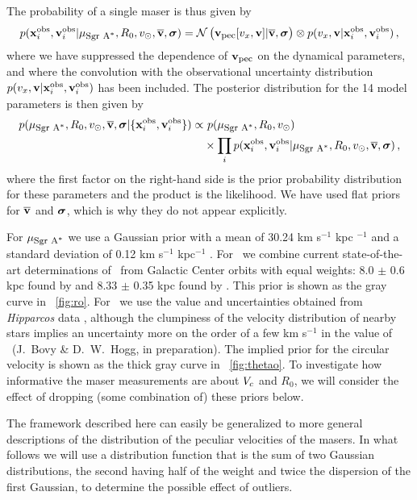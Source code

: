 The probability of a single maser is thus given by
\begin{equation}\label{eq:onelike}
p(\boldsymbol{\mathbf{x}}_i^{\mathrm{obs}},\boldsymbol{\mathbf{v}}_i^{\mathrm{obs}}|\mu_{\mbox{{\footnotesize Sgr A$^*$}}},R_0,v_\odot,\overline{\boldsymbol{\mathbf{v}}},\mbox{\boldmath$\sigma$}) =
\mathcal{N}\left(\boldsymbol{\mathbf{v}}_{\mbox{{\footnotesize pec}}}[v_x,\boldsymbol{\mathbf{v}}]|\overline{\boldsymbol{\mathbf{v}}},\mbox{\boldmath$\sigma$}\right)\otimes p(v_x,\boldsymbol{\mathbf{v}}|\boldsymbol{\mathbf{x}}_i^{\mathrm{obs}},\boldsymbol{\mathbf{v}}_i^{\mathrm{obs}})\,,
\end{equation}
where we have suppressed the dependence of $\boldsymbol{\mathbf{v}}_{\mbox{{\footnotesize pec}}}$ on the dynamical
parameters, and where the convolution with the observational
uncertainty distribution
$p(v_x,\boldsymbol{\mathbf{v}}|\boldsymbol{\mathbf{x}}_i^{\mathrm{obs}},\boldsymbol{\mathbf{v}}_i^{\mathrm{obs}})$ has been
included. The posterior distribution for the 14 model parameters is
then given by
\begin{equation}\label{eq:posterior}
\begin{split}
p(\mu_{\mbox{{\footnotesize Sgr A$^*$}}},R_0,v_\odot,\overline{\boldsymbol{\mathbf{v}}},\mbox{\boldmath$\sigma$}|\{\boldsymbol{\mathbf{x}}_i^{\mathrm{obs}},\boldsymbol{\mathbf{v}}_i^{\mathrm{obs}}\})
\propto & \ p(\mu_{\mbox{{\footnotesize Sgr A$^*$}}},R_0,v_\odot)\\
& \times \prod_i
p(\boldsymbol{\mathbf{x}}_i^{\mathrm{obs}},\boldsymbol{\mathbf{v}}_i^{\mathrm{obs}}|\mu_{\mbox{{\footnotesize Sgr A$^*$}}},R_0,v_\odot,\overline{\boldsymbol{\mathbf{v}}},\mbox{\boldmath$\sigma$})\,,
\end{split}
\end{equation}
where the first factor on the right-hand side is the prior probability
distribution for these parameters and the product is the
likelihood. We have used flat priors for $\overline{\boldsymbol{\mathbf{v}}}$ and
$\mbox{\boldmath$\sigma$}$, which is why they do not appear explicitly.

For $\mu_{\mbox{{\footnotesize Sgr A$^*$}}}$ we use a Gaussian prior with a mean of 30.24 km s$^{-1}$
kpc $^{-1}$ and a standard deviation of 0.12 km s$^{-1}$ kpc$^{-1}$
\citep{Reid04a}. For \Ro\ we combine current state-of-the-art
determinations of \Ro\ from Galactic Center orbits with equal weights:
8.0 $\pm$ 0.6 kpc found by \citet{Ghez08a} and 8.33 $\pm$ 0.35 kpc
found by \citet{Gillessen09a}. This prior is shown as the gray curve
in \figurename~\ref{fig:ro}. For \vsunlsr\ we use the value and
uncertainties obtained from \emph{Hipparcos} data
\citep{2005ApJ...629..268H}, although the clumpiness of the velocity
distribution of nearby stars \citep{1998AJ....115.2384D,Bovyveldist}
implies an uncertainty more on the order of a few km s$^{-1}$ in the
value of \vsunlsr\ (J.~Bovy \& D.~W.~Hogg, in preparation). The
implied prior for the circular velocity is shown as the thick gray
curve in \figurename~\ref{fig:thetao}. To investigate how informative
the maser measurements are about $V_c$ and $R_0$, we will consider the
effect of dropping (some combination of) these priors below.

The framework described here can easily be generalized to more general
descriptions of the distribution of the peculiar velocities of the
masers. In what follows we will use a distribution function that is
the sum of two Gaussian distributions, the second having half of the
weight and twice the dispersion of the first Gaussian, to determine
the possible effect of outliers.

